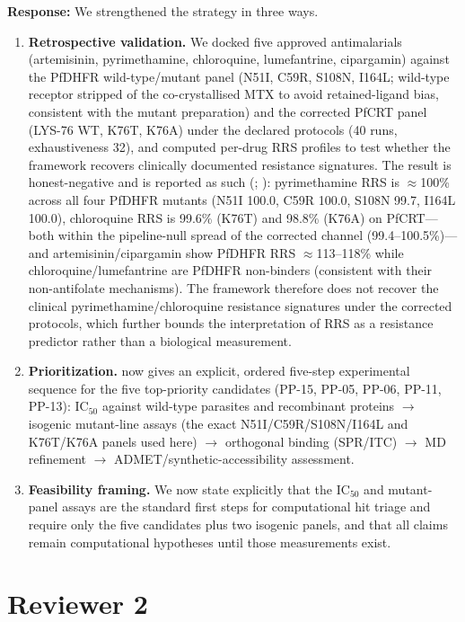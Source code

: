 \documentclass[11pt]{article}
\begin{document}
\textbf{Response:} We strengthened the strategy in three ways.
\begin{enumerate}[leftmargin=1.6em]
\item \textbf{Retrospective validation.} We docked five approved antimalarials
(artemisinin, pyrimethamine, chloroquine, lumefantrine, cipargamin) against the PfDHFR
wild-type/mutant panel (N51I, C59R, S108N, I164L; wild-type receptor stripped of the
co-crystallised MTX to avoid retained-ligand bias, consistent with the mutant
preparation) and the corrected PfCRT panel (LYS-76 WT, K76T, K76A) under the declared
protocols (40 runs, exhaustiveness 32), and computed per-drug RRS profiles to test
whether the framework recovers clinically documented resistance signatures. The result is
honest-negative and is reported as such (; ): pyrimethamine
RRS is $\approx$100\% across all four PfDHFR mutants (N51I 100.0, C59R 100.0,
S108N 99.7, I164L 100.0), chloroquine RRS is 99.6\% (K76T) and 98.8\%
(K76A) on PfCRT---both within the pipeline-null spread of the corrected
channel (99.4--100.5\%)---and artemisinin/cipargamin show PfDHFR RRS
$\approx$113--118\% while chloroquine/lumefantrine are PfDHFR non-binders
(consistent with their non-antifolate mechanisms). The framework therefore
does not recover the clinical pyrimethamine/chloroquine resistance signatures
under the corrected protocols, which further bounds the interpretation of RRS
as a resistance predictor rather than a biological measurement.
\item \textbf{Prioritization.}  now gives an explicit, ordered five-step experimental
sequence for the five top-priority candidates (PP-15, PP-05, PP-06, PP-11, PP-13):
IC$_{50}$ against wild-type parasites and recombinant proteins $\rightarrow$ isogenic
mutant-line assays (the exact N51I/C59R/S108N/I164L and K76T/K76A panels used here)
$\rightarrow$ orthogonal binding (SPR/ITC) $\rightarrow$ MD refinement $\rightarrow$
ADMET/synthetic-accessibility assessment.
\item \textbf{Feasibility framing.} We now state explicitly that the IC$_{50}$ and mutant-panel
assays are the standard first steps for computational hit triage and require only the five
candidates plus two isogenic panels, and that all claims remain computational hypotheses until
those measurements exist.
\end{enumerate}

\section*{Reviewer 2}
\end{document}

